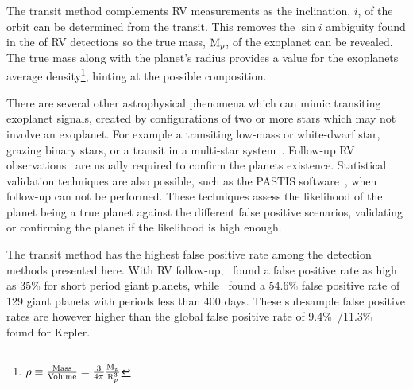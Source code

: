 The transit method complements {RV} measurements as the inclination, \(i\), of the orbit can be determined from the transit.
This removes the {$\sin{i}$} ambiguity found in the \Mpsini{} of {RV} detections so the true mass, \(\textrm{M}_{p}\), of the exoplanet can be revealed.
The true mass along with the planet's radius provides a value for the exoplanets average density\footnote{$\rho \equiv \frac{\textrm{Mass}}{\textrm{Volume}} = \frac{3}{4\pi}\frac{\textrm{M}_{p}}{\textrm{R}_{p}^{3}}$}, hinting at the possible composition.

There are several other astrophysical phenomena which can mimic transiting exoplanet signals, created by configurations of two or more stars which may not involve an exoplanet.
For example a transiting low-mass or white-dwarf star, grazing binary stars, or a transit in a multi-star system~\citep[see e.g.][]{cameron_extrasolar_2012, santerne_contribution_2013}.
Follow-up {RV} observations~\citep[e.g.][]{santerne_radial_2011} are usually required to confirm the planets existence.
Statistical validation techniques are also possible, such as the PASTIS software~\citep{diaz_pastis_2014}, when follow-up can not be performed.
These techniques assess the likelihood of the planet being a true planet against the different false positive scenarios, validating or confirming the planet if the likelihood is high enough.

The transit method has the highest false positive rate among the detection methods presented here.
With {RV} follow-up,~\citet{santerne_sophie_2012} found a false positive rate as high as 35\% for short period giant planets, while~\citet{santerne_sophie_2016} found a 54.6\% false positive rate of 129 giant planets with periods less than 400 days.
These sub-sample false positive rates are however higher than the global false positive rate of 9.4\%~\citep{fressin_false_2013}/11.3\%~\citep{santerne_contribution_2013} found for Kepler.


